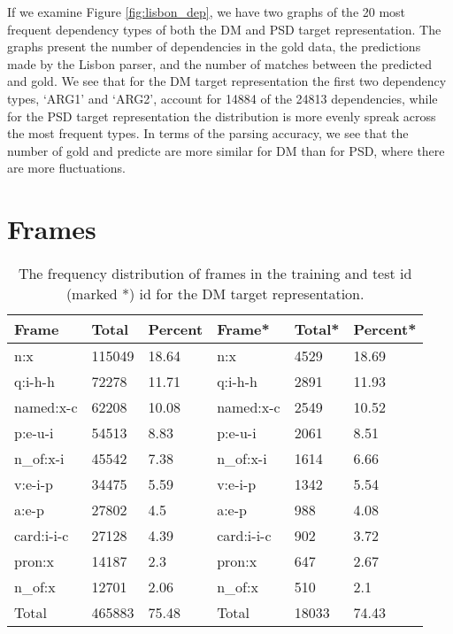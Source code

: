 If we examine Figure \ref{fig:lisbon_dep}, we have two graphs of the 20 most frequent dependency types of both the DM and PSD target representation. The graphs present the number of dependencies in the gold data, the predictions made by the Lisbon parser, and the number of matches between the predicted and gold. We see that for the DM target representation the first two dependency types, `ARG1' and `ARG2', account for 14884 of the 24813 dependencies, while for the PSD target representation the distribution is more evenly spreak across the most frequent types. In terms of the parsing accuracy, we see that the number of gold and predicte are more similar for DM than for PSD, where there are more fluctuations.



\section{Frames}

\begin{table}
    \centering
    \smaller[0.4]
    \begin{tabular}{@{}llllll@{}}
        \toprule
        \textbf{Frame} & \textbf{Total} & \textbf{Percent} & \textbf{Frame*} & \textbf{Total*} & \textbf{Percent*} \\
        \midrule
        n:x & 115049 & 18.64 & n:x & 4529 & 18.69 \\
        q:i-h-h & 72278 & 11.71 & q:i-h-h & 2891 & 11.93 \\
        named:x-c & 62208 & 10.08 & named:x-c & 2549 & 10.52 \\
        p:e-u-i & 54513 & 8.83 & p:e-u-i & 2061 & 8.51 \\
        n\_of:x-i & 45542 & 7.38 & n\_of:x-i & 1614 & 6.66 \\
        v:e-i-p & 34475 & 5.59 & v:e-i-p & 1342 & 5.54 \\
        a:e-p & 27802 & 4.5 & a:e-p & 988 & 4.08 \\
        card:i-i-c & 27128 & 4.39 & card:i-i-c & 902 & 3.72 \\
        pron:x & 14187 & 2.3 & pron:x & 647 & 2.67 \\
        n\_of:x & 12701 & 2.06 & n\_of:x & 510 & 2.1 \\
        \midrule
        Total & 465883 & 75.48  & Total & 18033 & 74.43 \\
        \bottomrule
    \end{tabular}
    \caption{The frequency distribution of frames in the training and test id (marked *) id for the DM target representation.}
    \label{table:dm_frames_freq}
\end{table}

